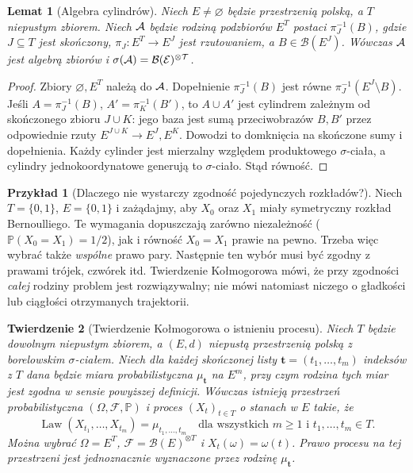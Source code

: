 \documentclass[11pt,a4paper,oneside]{report}
\numberwithin{equation}{chapter}
\theoremstyle{plain}
\newtheorem{twierdzenie}{Twierdzenie}[chapter]
\newtheorem{lemat}[twierdzenie]{Lemat}
\theoremstyle{definition}
\newtheorem{przyklad}{Przykład}[chapter]
\theoremstyle{remark}
\newcommand{\Prob}{\mathbb{P}}
\newcommand{\Law}{\operatorname{Law}}
\newcommand{\calF}{\mathcal{F}}
\newcommand{\calB}{\mathcal{B}}
\begin{document}
\begin{lemat}[Algebra cylindrów]
Niech $E\ne\varnothing$ będzie przestrzenią polską, a $T$
niepustym zbiorem. Niech $\cal A$ będzie rodziną podzbiorów
$E^T$ postaci $\pi_J^{-1}(B)$, gdzie
$J\subseteq T$ jest skończony, $\pi_J:E^T\to E^J$
jest rzutowaniem, a $B\in\calB(E^J)$.
Wówczas $\cal A$ jest algebrą zbiorów i
$\sigma(\cal A)=\calB(E)^{\otimes T}$.
\end{lemat}
\begin{proof}
Zbiory $\varnothing,E^T$ należą do $\cal A$.
Dopełnienie $\pi_J^{-1}(B)$ jest równe
$\pi_J^{-1}(E^J\setminus B)$. Jeśli
$A=\pi_J^{-1}(B)$, $A'=\pi_K^{-1}(B')$, to
$A\cup A'$ jest cylindrem zależnym od skończonego zbioru
$J\cup K$: jego baza jest sumą przeciwobrazów $B,B'$ przez
odpowiednie rzuty $E^{J\cup K}\to E^J,E^K$.
Dowodzi to domknięcia na skończone sumy i dopełnienia.
Każdy cylinder jest mierzalny względem produktowego
$\sigma$-ciała, a cylindry jednokoordynatowe generują
to $\sigma$-ciało. Stąd równość.
\end{proof}


\begin{przyklad}[Dlaczego nie wystarczy zgodność pojedynczych rozkładów?]
Niech $T=\{0,1\}$, $E=\{0,1\}$ i zażądajmy, aby
$X_0$ oraz $X_1$ miały symetryczny rozkład Bernoulliego.
Te wymagania dopuszczają zarówno niezależność
($\Prob(X_0=X_1)=1/2$), jak i równość $X_0=X_1$ prawie
na pewno. Trzeba więc wybrać także \emph{wspólne} prawo pary.
Następnie ten wybór musi być zgodny z prawami trójek,
czwórek itd. Twierdzenie Kołmogorowa mówi, że przy
zgodności \emph{całej} rodziny problem jest rozwiązywalny;
nie mówi natomiast niczego o gładkości lub ciągłości
otrzymanych trajektorii.
\end{przyklad}

\begin{twierdzenie}[Twierdzenie Kołmogorowa o istnieniu procesu]
\label{thm:kol-ext}
Niech $T$ będzie dowolnym niepustym zbiorem, a $(E,d)$
niepustą przestrzenią polską z borelowskim $\sigma$-ciałem.
Niech dla każdej skończonej listy $\mathbf t=(t_1,\ldots,t_m)$
indeksów z $T$ dana będzie miara probabilistyczna
$\mu_{\mathbf t}$ na $E^m$, przy czym rodzina tych miar
jest zgodna w sensie powyższej definicji.
Wówczas istnieją przestrzeń probabilistyczna
$(\Omega,\calF,\Prob)$ i proces
$(X_t)_{t\in T}$ o stanach w $E$ takie, że
\[
\Law(X_{t_1},\ldots,X_{t_m})=\mu_{t_1,\ldots,t_m}
\quad\text{dla wszystkich }m\ge1\text{ i }t_1,\ldots,t_m\in T.
\]
Można wybrać $\Omega=E^T$,
$\calF=\calB(E)^{\otimes T}$ i $X_t(\omega)=\omega(t)$.
Prawo procesu na tej przestrzeni jest jednoznacznie wyznaczone
przez rodzinę $\mu_{\mathbf t}$.
\end{twierdzenie}
\end{document}
